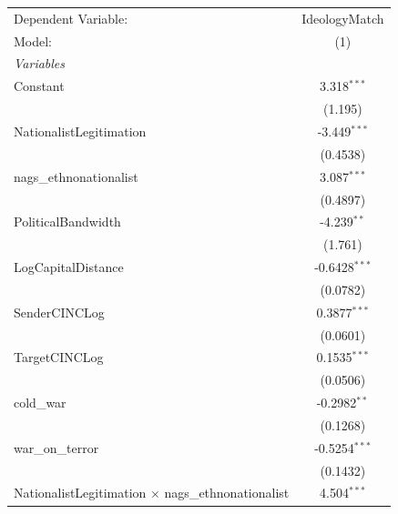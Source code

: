
\begingroup
\centering
\begin{tabular}{lc}
   \tabularnewline \midrule \midrule
   Dependent Variable:                                       & IdeologyMatch\\  
   Model:                                                    & (1)\\  
   \midrule
   \emph{Variables}\\
   Constant                                                  & 3.318$^{***}$\\   
                                                             & (1.195)\\   
   NationalistLegitimation                                   & -3.449$^{***}$\\   
                                                             & (0.4538)\\   
   nags\_ethnonationalist                                    & 3.087$^{***}$\\   
                                                             & (0.4897)\\   
   PoliticalBandwidth                                        & -4.239$^{**}$\\   
                                                             & (1.761)\\   
   LogCapitalDistance                                        & -0.6428$^{***}$\\   
                                                             & (0.0782)\\   
   SenderCINCLog                                             & 0.3877$^{***}$\\   
                                                             & (0.0601)\\   
   TargetCINCLog                                             & 0.1535$^{***}$\\   
                                                             & (0.0506)\\   
   cold\_war                                                 & -0.2982$^{**}$\\   
                                                             & (0.1268)\\   
   war\_on\_terror                                           & -0.5254$^{***}$\\   
                                                             & (0.1432)\\   
   NationalistLegitimation $\times$ nags\_ethnonationalist   & 4.504$^{***}$\\   

\end{tabular}
